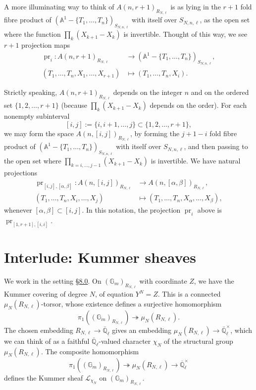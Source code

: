 A more illuminating way to think of \(A(n,r+1)_{R_{N,\ell}}\) is as lying in the \(r+1\) fold fibre product of \((\mathbb{A}^1-\{T_1,\ldots,T_n\})_{S_{N,n,\ell}}\) with itself over \(S_{N,n,\ell}\), as the open set where the function \(\prod_k(X_{k+1}-X_k)\) is invertible. Thought of this way, we see \(r+1\) projection maps
\[
\begin{aligned}
\operatorname{pr}_i:A(n,r+1)_{R_{N,\ell}}&\to(\mathbb{A}^1-\{T_1,\ldots,T_n\})_{S_{N,n,\ell}},\\
(T_1,\ldots,T_n,X_1,\ldots,X_{r+1})&\mapsto(T_1,\ldots,T_n,X_i).
\end{aligned}
\]

Strictly speaking, \(A(n,r+1)_{R_{N,\ell}}\) depends on the integer \(n\) and on the ordered set \(\{1,2,\ldots,r+1\}\) (because \(\prod_k(X_{k+1}-X_k)\) depends on the order). For each nonempty subinterval
\[
[i,j]:=\{i,i+1,\ldots,j\}\subset\{1,2,\ldots,r+1\},
\]
we may form the space \(A(n,[i,j])_{R_{N,\ell}}\), by forming the \(j+1-i\) fold fibre product of \((\mathbb{A}^1-\{T_1,\ldots,T_n\})_{S_{N,n,\ell}}\) with itself over \(S_{N,n,\ell}\), and then passing to the open set where \(\prod_{k=i,\ldots,j-1}(X_{k+1}-X_k)\) is invertible. We have natural projections
\[
\begin{aligned}
\operatorname{pr}_{[i,j],[\alpha,\beta]}:A(n,[i,j])_{R_{N,\ell}}&\to A(n,[\alpha,\beta])_{R_{N,\ell}},\\
(T_1,\ldots,T_n,X_i,\ldots,X_j)&\mapsto(T_1,\ldots,T_n,X_\alpha,\ldots,X_\beta),
\end{aligned}
\]
whenever \([\alpha,\beta]\subset[i,j]\). In this notation, the projection \(\operatorname{pr}_i\) above is \(\operatorname{pr}_{[1,r+1],[i,i]}\).

\section{Interlude: Kummer sheaves}
\label{sec:8.1}

We work in the setting \hyperref[sec:8.0]{\S8.0}. On \((\mathbb{G}_m)_{R_{N,\ell}}\) with coordinate \(Z\), we have the Kummer covering of degree \(N\), of equation \(Y^N=Z\). This is a connected \(\mu_N(R_{N,\ell})\)-torsor, whose existence defines a surjective homomorphism
\[
\pi_1((\mathbb{G}_m)_{R_{N,\ell}})\twoheadrightarrow\mu_N(R_{N,\ell}).
\]
The chosen embedding \(R_{N,\ell}\to\overline{\mathbb{Q}}_\ell\) gives an embedding \(\mu_N(R_{N,\ell})\to\overline{\mathbb{Q}}_\ell^{\times}\), which we can think of as a faithful \(\overline{\mathbb{Q}}_\ell\)-valued character \(\chi_N\) of the structural group \(\mu_N(R_{N,\ell})\). The composite homomorphism
\[
\pi_1((\mathbb{G}_m)_{R_{N,\ell}})\twoheadrightarrow\mu_N(R_{N,\ell})\to\overline{\mathbb{Q}}_\ell^{\times}
\]
defines the Kummer sheaf \(\mathcal{L}_{\chi_N}\) on \((\mathbb{G}_m)_{R_{N,\ell}}\).

